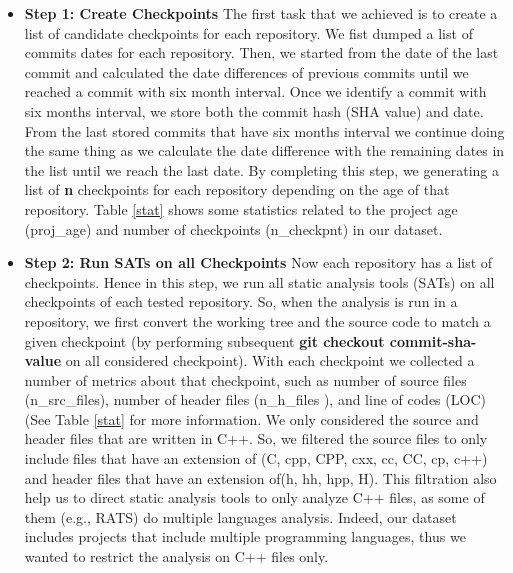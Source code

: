 \begin{itemize}[leftmargin=*]
\item \textbf{ Step 1: Create Checkpoints}
The first task that we achieved is to create a list of candidate checkpoints for each repository. We fist dumped a list of commits dates for each repository. Then, we started from the date of the last commit and calculated the date differences of previous commits until we reached a commit with six month interval. Once we identify a commit with six months interval, we store both the commit hash (SHA value) and date. From the last stored commits that have six months interval we continue doing the same thing as we calculate the date difference with the remaining dates in the list until we reach the last date. By completing this step, we generating a list of \textbf{n} checkpoints for each repository depending on the age of that repository. Table \ref{stat} shows some statistics related to the project age (proj\_age) and number of checkpoints (n\_checkpnt) in our dataset.

\item \textbf{ Step 2: Run SATs on all Checkpoints}
Now each repository has a list of checkpoints. Hence in this step, we  run all static analysis tools (SATs) on all checkpoints of each tested repository.  So, when the analysis is run in a repository,  we first convert the working tree and the source code to match a given checkpoint (by performing subsequent \textbf{ git checkout commit-sha-value} on all considered checkpoint).  With each checkpoint we collected a number of metrics about that checkpoint, such as  number of source files (n\_src\_files), number of header files (n\_h\_files ), and line of codes (LOC) (See Table \ref{stat} for more information. We only considered the source and header files that are written in C++. So, we filtered the source files to only include files that have an extension of (C, cpp, CPP, cxx, cc, CC, cp, c++)  and header files that have an extension of(h, hh, hpp, H). This filtration also help us to direct static analysis tools to only analyze C++ files, as some of them (e.g., RATS) do multiple languages analysis. Indeed, our dataset includes projects that  include multiple programming languages, thus we wanted to restrict the analysis on C++ files only.


\end{itemize}
